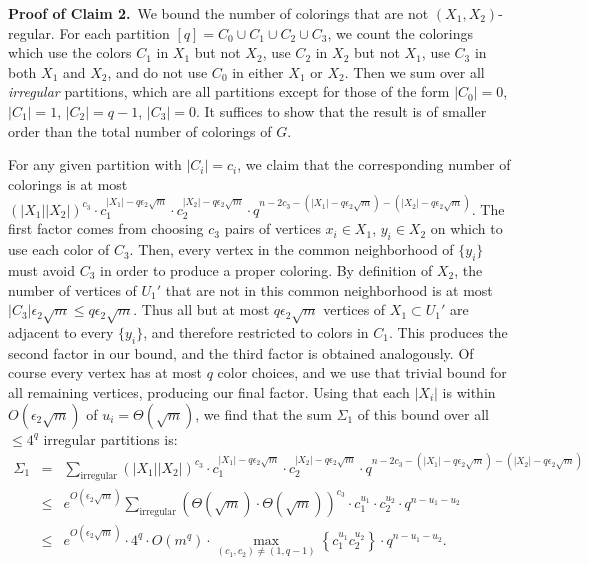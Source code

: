 \documentclass[11pt]{article}
\begin{document}
\vspace{3mm}




\noindent \textbf{Proof of Claim 2.}\, We bound the number of
colorings that are not $(X_1, X_2)$-regular.  For each partition $[q]
= C_0 \cup C_1 \cup C_2 \cup C_3$, we count the colorings which use
the colors $C_1$ in $X_1$ but not $X_2$, use $C_2$ in $X_2$ but not
$X_1$, use $C_3$ in both $X_1$ and $X_2$, and do not use $C_0$ in
either $X_1$ or $X_2$.  Then we sum over all \emph{irregular}\/
partitions, which are all partitions except for those of the form
$|C_0| = 0$, $|C_1| = 1$, $|C_2| = q-1$, $|C_3| = 0$.  It suffices to
show that the result is of smaller order than the total number of
colorings of $G$.

For any given partition with $|C_i| = c_i$, we claim that the
corresponding number of colorings is at most $(|X_1| |X_2|)^{c_3}
\cdot c_1^{|X_1| - q \epsilon_2 \sqrt{m}} \cdot c_2^{|X_2| - q
  \epsilon_2 \sqrt{m}} \cdot q^{n - 2c_3 - (|X_1| - q \epsilon_2
  \sqrt{m}) - (|X_2| - q \epsilon_2 \sqrt{m})}$.  The first factor
comes from choosing $c_3$ pairs of vertices $x_i \in X_1$, $y_i \in
X_2$ on which to use each color of $C_3$.  Then, every vertex in the
common neighborhood of $\{y_i\}$ must avoid $C_3$ in order to produce
a proper coloring.  By definition of $X_2$, the number of vertices of
$U_1'$ that are not in this common neighborhood is at most $|C_3|
\epsilon_2 \sqrt{m} \leq q \epsilon_2 \sqrt{m}$.  Thus all but at most
$q \epsilon_2 \sqrt{m}$ vertices of $X_1 \subset U_1'$ are adjacent to
every $\{y_i\}$, and therefore restricted to colors in $C_1$.  This
produces the second factor in our bound, and the third factor is
obtained analogously.  Of course every vertex has at most $q$ color
choices, and we use that trivial bound for all remaining vertices,
producing our final factor.  Using that each $|X_i|$ is within
$O(\epsilon_2 \sqrt{m})$ of $u_i = \Theta(\sqrt{m})$, we find that the
sum $\Sigma_1$ of this bound over all $\leq 4^q$ irregular partitions
is:
\begin{eqnarray*}
  \Sigma_1 &=& \sum_{\text{irregular}} (|X_1| |X_2|)^{c_3} \cdot c_1^{|X_1|
    - q \epsilon_2 \sqrt{m}} \cdot c_2^{|X_2| - q \epsilon_2 \sqrt{m}}
  \cdot q^{n - 2c_3 - (|X_1| - q \epsilon_2 \sqrt{m}) - (|X_2| - q \epsilon_2
    \sqrt{m})} \\
  &\leq& e^{O(\epsilon_2 \sqrt{m})} \sum_{\text{irregular}} (\Theta(\sqrt{m}) \cdot \Theta(\sqrt{m}))^{c_3} \cdot c_1^{u_1} \cdot c_2^{u_2}
  \cdot q^{n - u_1 - u_2} \\
  &\leq& e^{O(\epsilon_2 \sqrt{m})} \cdot 4^q \cdot O(m^q) \cdot 
  \max_{(c_1, c_2) \neq (1, q-1)} \left\{ c_1^{u_1} c_2^{u_2} \right\} \cdot
  q^{n - u_1 - u_2}.
\end{eqnarray*}
\end{document}
